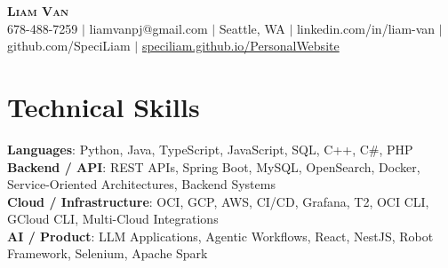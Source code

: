 \documentclass[letterpaper,11pt]{article}
\begin{document}

%
\begin{center}
    \textbf{\Huge \scshape Liam Van} \\ \vspace{1pt}
    \small 678-488-7259 $|$ \small {liamvanpj@gmail.com} $|$ Seattle, WA
 {{$|$ linkedin.com/in/liam-van} {$|$ github.com/SpeciLiam} {$|$ \href{https://speciliam.github.io/PersonalWebsite}{speciliam.github.io/PersonalWebsite}}}

\end{center}

\section{Technical Skills}
 \begin{itemize}[leftmargin=0.15in, label={}]
    \small{\item{
     \textbf{Languages}{: Python, Java, TypeScript, JavaScript, SQL, C++, C\#, PHP} \\
     \textbf{Backend / API}{: REST APIs, Spring Boot, MySQL, OpenSearch, Docker, Service-Oriented Architectures, Backend Systems} \\
     \textbf{Cloud / Infrastructure}{: OCI, GCP, AWS, CI/CD, Grafana, T2, OCI CLI, GCloud CLI, Multi-Cloud Integrations} \\
     \textbf{AI / Product}{: LLM Applications, Agentic Workflows, React, NestJS, Robot Framework, Selenium, Apache Spark} \\
    }}
 \end{itemize}
%
\end{document}
